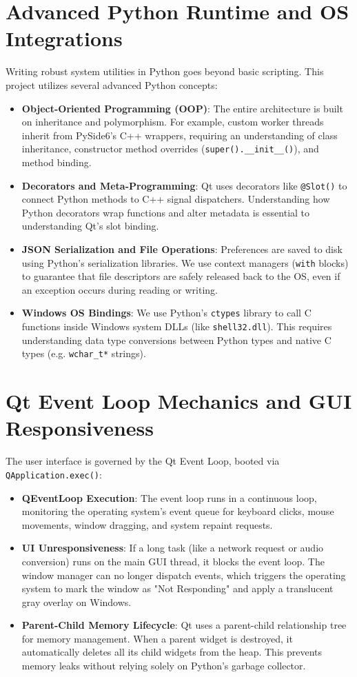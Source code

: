 \documentclass[12pt]{report}
\begin{document}
\section{Advanced Python Runtime and OS Integrations}
Writing robust system utilities in Python goes beyond basic scripting. This project utilizes several advanced Python concepts:
\begin{itemize}[leftmargin=*]
    \item \textbf{Object-Oriented Programming (OOP)}: The entire architecture is built on inheritance and polymorphism. For example, custom worker threads inherit from PySide6's C++ wrappers, requiring an understanding of class inheritance, constructor method overrides (\texttt{super().\_\_init\_\_()}), and method binding.
    \item \textbf{Decorators and Meta-Programming}: Qt uses decorators like \texttt{@Slot()} to connect Python methods to C++ signal dispatchers. Understanding how Python decorators wrap functions and alter metadata is essential to understanding Qt's slot binding.
    \item \textbf{JSON Serialization and File Operations}: Preferences are saved to disk using Python's serialization libraries. We use context managers (\texttt{with} blocks) to guarantee that file descriptors are safely released back to the OS, even if an exception occurs during reading or writing.
    \item \textbf{Windows OS Bindings}: We use Python's \texttt{ctypes} library to call C functions inside Windows system DLLs (like \texttt{shell32.dll}). This requires understanding data type conversions between Python types and native C types (e.g. \texttt{wchar\_t*} strings).
\end{itemize}

\section{Qt Event Loop Mechanics and GUI Responsiveness}
The user interface is governed by the Qt Event Loop, booted via \texttt{QApplication.exec()}:
\begin{itemize}[leftmargin=*]
    \item \textbf{QEventLoop Execution}: The event loop runs in a continuous loop, monitoring the operating system's event queue for keyboard clicks, mouse movements, window dragging, and system repaint requests.
    \item \textbf{UI Unresponsiveness}: If a long task (like a network request or audio conversion) runs on the main GUI thread, it blocks the event loop. The window manager can no longer dispatch events, which triggers the operating system to mark the window as "Not Responding" and apply a translucent gray overlay on Windows.
    \item \textbf{Parent-Child Memory Lifecycle}: Qt uses a parent-child relationship tree for memory management. When a parent widget is destroyed, it automatically deletes all its child widgets from the heap. This prevents memory leaks without relying solely on Python's garbage collector.
\end{itemize}
\end{document}
